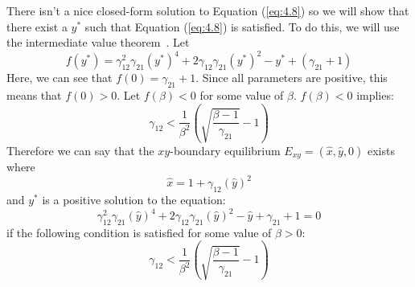 There isn't a nice closed-form solution to Equation (\ref{eq:4.8}) so we will show that there exist a $y^*$ such that Equation (\ref{eq:4.8}) is satisfied. To do this, we will use the intermediate value theorem~\cite{book:2946356}. Let
\[
f\left(y^*\right)=\gamma_{12}^2\gamma_{21}\left(y^*\right)^4+2\gamma_{12}\gamma_{21}\left(y^*\right)^2-y^*+\left(\gamma_{21}+1\right)
\]
Here, we can see that $f(0)=\gamma_{21}+1$. Since all parameters are positive, this means that $f(0)>0$. Let $f(\beta)<0$ for some value of $\beta$. $f\left(\beta\right)<0$ implies:
\[
\gamma_{12}<\frac1{\beta^2}\left(\sqrt{\frac{\beta-1}{\gamma_{21}}}-1\right)
\]
Therefore we can say that the $xy$-boundary equilibrium $E_{xy}=\left(\hat{x},\hat{y},0\right)$ exists where
\[
\hat{x}=1+\gamma_{12}\left(\hat{y}\right)^2
\]
and $y^*$ is a positive solution to the equation:
\[
\gamma_{12}^2\gamma_{21}\left(\hat{y}\right)^4+2\gamma_{12}\gamma_{21}\left(\hat{y}\right)^2-\hat{y}+\gamma_{21}+1=0
\]
if the following condition is satisfied for some value of $\beta>0$:
\[
\gamma_{12}<\frac1{\beta^2}\left(\sqrt{\frac{\beta-1}{\gamma_{21}}}-1\right)
\]

